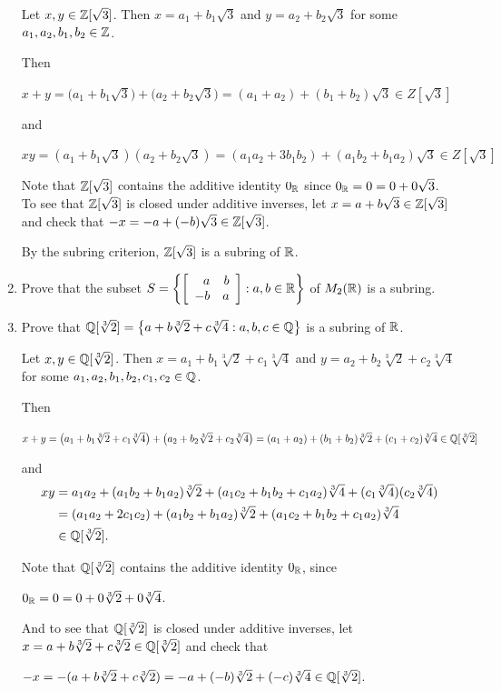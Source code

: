 \documentclass[11pt,fleqn,dvipsnames,usenames]{article}
\begin{document}
\begin{enumerate}[1.]
\solution Let $x,y\in\Z[\sqrt{3}]$.  Then $x = a_{1} + b_{1}\sqrt{3}$ and $y = a_{2} + b_{2}\sqrt{3}$ for some $a_{1},a_{2},b_{1},b_{2}\in \Z$.

Then
\begin{center}
$x + y = \big(a_{1} + b_{1}\sqrt{3}\big) + \big(a_{2} + b_{2}\sqrt{3}\big) = (a_{1} + a_{2}) + (b_{1} + b_{2})\sqrt{3}\in Z[\sqrt{3}]$
\end{center}
and
\begin{center}
$xy = (a_{1} + b_{1}\sqrt{3})(a_{2} + b_{2}\sqrt{3}) = (a_{1}a_{2} + 3b_{1}b_{2}) + (a_{1}b_{2} + b_{1}a_{2})\sqrt{3}\in Z[\sqrt{3}]$
\end{center}

Note that $\Z[\sqrt{3}]$ contains the additive identity $0_{\R}$ since $0_{\R} = 0 = 0 + 0\sqrt{3}$.  To see that $\Z[\sqrt{3}]$ is closed under additive inverses, let $x = a + b\sqrt{3}\in \Z[\sqrt{3}]$ and check that $-x = -a +(-b)\sqrt{3}\in \Z[\sqrt{3}]$.

By the subring criterion, $\Z[\sqrt{3}]$ is a subring of $\R$.
\item Prove that the subset $S = \SET{\MATRIX{rr}{a & b\\-b & a}:a,b\in \R}$ of $M_{2}(\R)$ is a subring.
\item Prove that $\Q[\sqrt[3]{2}] = \SET{a + b\sqrt[3]{2} + c\sqrt[3]{4}:a,b,c\in\Q}$ is a subring of $\R$.
\vsmsp

\solution Let $x,y\in\Q[\sqrt[3]{2}]$.  Then $x = a_{1} + b_{1}\sqrt[3]{2} + c_{1}\sqrt[3]{4}$ and $y = a_{2} + b_{2}\sqrt[3]{2} + c_{2}\sqrt[3]{4}$ for some $a_{1},a_{2},b_{1},b_{2},c_{1},c_{2}\in \Q$.

Then
\begin{center}
$x + y = \big(a_{1} + b_{1}\sqrt[3]{2} + c_{1}\sqrt[3]{4}\big) + \big(a_{2} + b_{2}\sqrt[3]{2} + c_{2}\sqrt[3]{4}\big) = (a_{1} + a_{2}) + (b_{1} + b_{2})\sqrt[3]{2} + (c_{1} + c_{2})\sqrt[3]{4}\in \Q[\sqrt[3]{2}]$
\end{center}
and
\begin{align*}
xy &= a_{1}a_{2} + (a_{1}b_{2} + b_{1}a_{2})\sqrt[3]{2} + (a_{1}c_{2} + b_{1}b_{2} + c_{1}a_{2})\sqrt[3]{4} + (c_{1}\sqrt[3]{4})(c_{2}\sqrt[3]{4})\\
&= (a_{1}a_{2}+2c_{1}c_{2}) + (a_{1}b_{2} + b_{1}a_{2})\sqrt[3]{2} + (a_{1}c_{2} + b_{1}b_{2} + c_{1}a_{2})\sqrt[3]{4}\\
&\in\Q[\sqrt[3]{2}].
\end{align*}

Note that $\Q[\sqrt[3]{2}]$ contains the additive identity $0_{\R}$, since
\begin{center}
$0_{\R} = 0 = 0 + 0\sqrt[3]{2} + 0\sqrt[3]{4}$.
\end{center}
And to see that $\Q[\sqrt[3]{2}]$ is closed under additive inverses, let $x = a + b\sqrt[3]{2} + c\sqrt[3]{2}\in \Q[\sqrt[3]{2}]$ and check that
\begin{center}
$-x = -(a + b\sqrt[3]{2} + c\sqrt[3]{2}) = -a +(-b)\sqrt[3]{2} + (-c)\sqrt[3]{4}\in \Q[\sqrt[3]{2}]$.
\end{center}


\end{enumerate}
\end{document}
